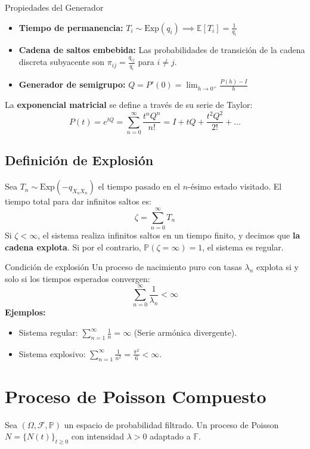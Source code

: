 \documentclass[10pt,a4paper]{article}
\begin{document}
\begin{nota}{Propiedades del Generador}
\begin{itemize}
    \item \textbf{Tiempo de permanencia:} $T_i \sim \text{Exp}(q_i) \implies \mathbb{E}[T_i] = \frac{1}{q_i}$
    \item \textbf{Cadena de saltos embebida:} Las probabilidades de transición de la cadena discreta subyacente son $\pi_{ij} = \frac{q_{ij}}{q_i}$ para $i \neq j$.
    \item \textbf{Generador de semigrupo:} $Q = P'(0) = \lim_{h \to 0^+} \frac{P(h) - I}{h}$
\end{itemize}
\end{nota}

La \textbf{exponencial matricial} se define a través de su serie de Taylor:
\[ P(t) = e^{tQ} = \sum_{n=0}^\infty \frac{t^n Q^n}{n!} = I + tQ + \frac{t^2 Q^2}{2!} + \dots \]

\subsection{Definición de Explosión}
Sea $T_n \sim \text{Exp}(-q_{X_n X_n})$ el tiempo pasado en el $n$-ésimo estado visitado. El tiempo total para dar infinitos saltos es:
\[ \zeta = \sum_{n=0}^\infty T_n \]
Si $\zeta < \infty$, el sistema realiza infinitos saltos en un tiempo finito, y decimos que \textbf{la cadena explota}. Si por el contrario, $\mathbb{P}(\zeta = \infty) = 1$, el sistema es regular.

\begin{ejercicio}{Condición de explosión}
Un proceso de nacimiento puro con tasas $\lambda_n$ explota si y solo si los tiempos esperados convergen:
\[ \sum_{n=0}^\infty \frac{1}{\lambda_n} < \infty \]
\textbf{Ejemplos:}
\begin{itemize}
    \item Sistema regular: $\sum_{n=1}^\infty \frac{1}{n} = \infty$ (Serie armónica divergente).
    \item Sistema explosivo: $\sum_{n=1}^\infty \frac{1}{n^2} = \frac{\pi^2}{6} < \infty$.
\end{itemize}
\end{ejercicio}


\section{Proceso de Poisson Compuesto}

Sea $(\Omega, \mathcal{F}, \mathbb{P})$ un espacio de probabilidad filtrado. Un proceso de Poisson $N = \{N(t)\}_{t \ge 0}$ con intensidad $\lambda > 0$ adaptado a $\mathbb{F}$.
\end{document}
